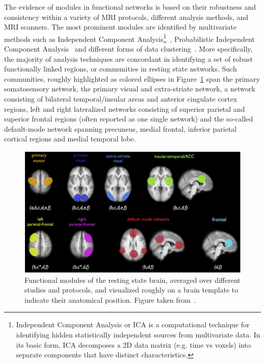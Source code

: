 The evidence of modules in functional networks is based on their robustness and consistency within a variety of MRI protocols, different analysis methods, and MRI scanners.
The most prominent modules are identified by multivariate methods such as Independent Component Analysis\footnote{Independent Component Analysis or ICA is a computational technique for identifying hidden statistically independent sources from multivariate data. In its basic form, ICA decomposes a 2D data matrix (e.g. time vs voxels) into separate components that have distinct characteristics.}~\cite{beckmann2012,calhoun2001}, Probabilistic Independent Component Analysis~\cite{beckmann2004,beckmann2005} and different forms of data clustering~\cite{cordes2002,lee2012}.
More specifically, the majority of analysis techniques are concordant in identifying a set of robust functionally linked regions, or communities in resting state networks.
Such communities, roughly highlighted as colored ellipses in Figure~\ref{fig:vandenheuvelnetworks} span the primary somatosensory network, the primary visual and extra-striate network, a network consisting of bilateral temporal/insular areas and anterior cingulate cortex regions, left and right lateralized networks consisting of superior parietal and superior frontal regions (often reported as one single network) and the so-called default-mode network spanning precuneus, medial frontal, inferior parietal cortical regions and medial temporal lobe.

\begin{figure}[!ht]
\centering
\includegraphics[width=1.0\textwidth]{images/vandenheuvel_networks.pdf}
\caption{Functional modules of the resting state brain, averaged over different studies and protocols, and visualized roughly on a brain template to indicate their anatomical position. Figure taken from~\cite{vandenheuvel2010}.}
\label{fig:vandenheuvelnetworks}
\end{figure}


